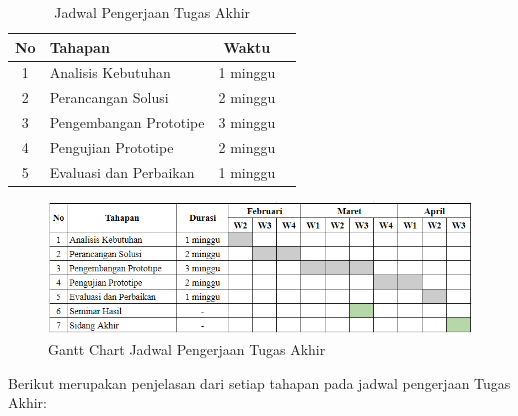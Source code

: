 \begin{table}[h]
	\caption{Jadwal Pengerjaan Tugas Akhir}
	\vspace{0.25cm}
	\begin{center}
		\begin{tabular}{|c|l|c|l|}
			\hline
			\textbf{No} & \textbf{Tahapan} & \textbf{Waktu} \\ \hline
			1 & Analisis Kebutuhan & 1 minggu \\ \hline
			2 & Perancangan Solusi & 2 minggu \\ \hline
			3 & Pengembangan Prototipe & 3 minggu \\ \hline
			4 & Pengujian Prototipe & 2 minggu \\ \hline
			5 & Evaluasi dan Perbaikan & 1 minggu \\ \hline
		\end{tabular}
	\end{center}
\end{table}

\begin{figure}[ht]
	\centering
	\includegraphics[width=1\textwidth]{resources/chapter-4/gantt-chart.png}
	\caption{Gantt Chart Jadwal Pengerjaan Tugas Akhir}
	\label{image:gantt-chart}
\end{figure}

Berikut merupakan penjelasan dari setiap tahapan pada jadwal pengerjaan Tugas Akhir:

